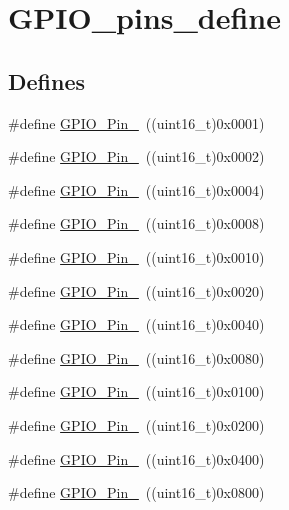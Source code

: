 \hypertarget{group__GPIO__pins__define}{
\section{GPIO\_\-pins\_\-define}
\label{group__GPIO__pins__define}
}
\subsection*{Defines}
\begin{DoxyCompactItemize}
\item 
\#define \hyperlink{group__GPIO__pins__define_gab305b8d1be9f89bf2b4a05589b456049}{GPIO\_\-Pin\_}~((uint16\_\-t)0x0001)
\item 
\#define \hyperlink{group__GPIO__pins__define_ga29db642c26f1fa0fffc3ecadcd30f82b}{GPIO\_\-Pin\_}~((uint16\_\-t)0x0002)
\item 
\#define \hyperlink{group__GPIO__pins__define_gabdf6630324b2f99360537a310687187c}{GPIO\_\-Pin\_}~((uint16\_\-t)0x0004)
\item 
\#define \hyperlink{group__GPIO__pins__define_ga763c6544859dbe28cd3f8ad820045556}{GPIO\_\-Pin\_}~((uint16\_\-t)0x0008)
\item 
\#define \hyperlink{group__GPIO__pins__define_gacbf04d09b954606cdcc55eb2e81780e3}{GPIO\_\-Pin\_}~((uint16\_\-t)0x0010)
\item 
\#define \hyperlink{group__GPIO__pins__define_ga32dbe930f52ce5ab60190c65e9dc741e}{GPIO\_\-Pin\_}~((uint16\_\-t)0x0020)
\item 
\#define \hyperlink{group__GPIO__pins__define_gaf047899d873f27c2db9f50b342e35a58}{GPIO\_\-Pin\_}~((uint16\_\-t)0x0040)
\item 
\#define \hyperlink{group__GPIO__pins__define_ga7346b6ce5507bd28a7a79e7dcc816c08}{GPIO\_\-Pin\_}~((uint16\_\-t)0x0080)
\item 
\#define \hyperlink{group__GPIO__pins__define_gac891f0984dc64af3567577fbf13ab304}{GPIO\_\-Pin\_}~((uint16\_\-t)0x0100)
\item 
\#define \hyperlink{group__GPIO__pins__define_gaad1891082d5d6bcac06c2729a9fdd2f0}{GPIO\_\-Pin\_}~((uint16\_\-t)0x0200)
\item 
\#define \hyperlink{group__GPIO__pins__define_ga726af6407ba60ac60f02057227c2d348}{GPIO\_\-Pin\_}~((uint16\_\-t)0x0400)
\item 
\#define \hyperlink{group__GPIO__pins__define_ga5139d5bc3d15784ae7794ed2ae1ff767}{GPIO\_\-Pin\_}~((uint16\_\-t)0x0800)

\end{DoxyCompactItemize}
